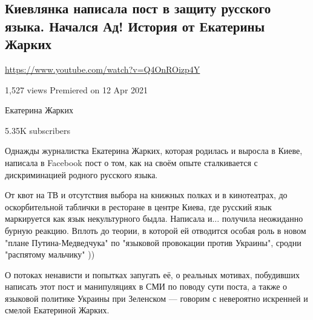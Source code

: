  
 
 
 
 
\subsection{Киевлянка написала пост в защиту русского языка. Начался Ад! История от Екатерины Жарких}

\url{https://www.youtube.com/watch?v=Q4OnROizp4Y}

1,527 views Premiered on 12 Apr 2021

Екатерина Жарких

5.35K subscribers

Однажды журналистка Екатерина Жарких, которая родилась и выросла в Киеве,
написала в Facebook пост о том, как на своём опыте сталкивается с
дискриминацией родного русского языка. 

От квот на ТВ и отсутствия выбора на книжных полках и в кинотеатрах, до
оскорбительной таблички в ресторане в центре Киева, где русский язык
маркируется как язык некультурного быдла. Написала и... получила неожиданно
бурную реакцию. Вплоть до теории, в которой ей отводится особая роль в новом
"плане Путина-Медведчука" по "языковой провокации против Украины", сродни
"распятому мальчику" ))

О потоках ненависти и попытках запугать её, о реальных мотивах, побудивших
написать этот пост и манипуляциях в СМИ по поводу сути поста, а также о
языковой политике Украины при Зеленском — говорим с невероятно искренней и
смелой Екатериной Жарких.



